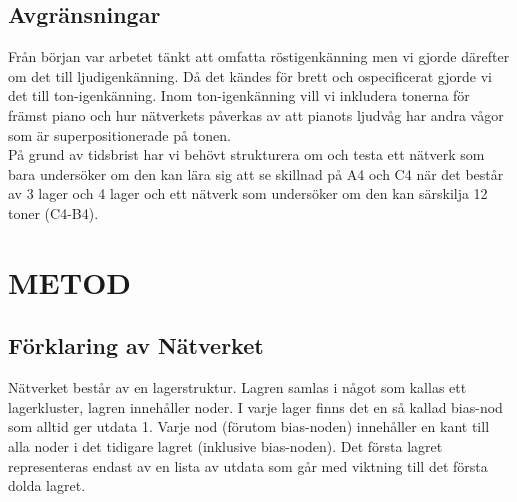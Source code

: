\documentclass[a4paper,10pt]{article}
\begin{document}
\subsection{Avgränsningar}
Från början var arbetet tänkt att omfatta röstigenkänning men vi gjorde därefter om det till ljudigenkänning. Då det kändes för brett och ospecificerat gjorde vi det till ton-igenkänning. Inom ton-igenkänning vill vi inkludera tonerna för främst piano och hur nätverkets påverkas av att pianots ljudvåg har andra vågor som är superpositionerade på tonen. \\
På grund av tidsbrist har vi behövt strukturera om och testa ett nätverk som bara undersöker om den kan lära sig att se skillnad på A4 och C4 när det består av 3 lager och 4 lager och ett nätverk som undersöker om den kan särskilja 12 toner (C4-B4).

\section{METOD}	

\subsection{Förklaring av Nätverket}
Nätverket består av en lagerstruktur. Lagren samlas i något som kallas ett lagerkluster, lagren innehåller noder. I varje lager finns det en så kallad bias-nod som alltid ger utdata 1. Varje nod (förutom bias-noden) innehåller en kant till alla noder i det tidigare lagret (inklusive bias-noden). Det första lagret representeras endast av en lista av utdata som går med viktning till det första dolda lagret.


\end{document}
